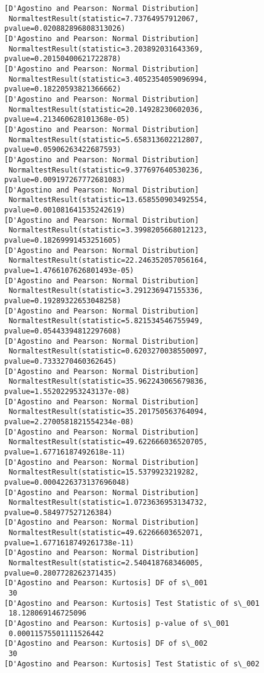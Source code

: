 \documentclass[11pt]{article}
\begin{document}
\begin{Verbatim}[commandchars=\\\{\}]
[D'Agostino and Pearson: Normal Distribution]
 NormaltestResult(statistic=7.73764957912067, pvalue=0.020882896808313026)
[D'Agostino and Pearson: Normal Distribution]
 NormaltestResult(statistic=3.203892031643369, pvalue=0.20150400621722878)
[D'Agostino and Pearson: Normal Distribution]
 NormaltestResult(statistic=3.4052354059096994, pvalue=0.18220593821366662)
[D'Agostino and Pearson: Normal Distribution]
 NormaltestResult(statistic=20.14928230602036, pvalue=4.213460628101368e-05)
[D'Agostino and Pearson: Normal Distribution]
 NormaltestResult(statistic=5.658313602212807, pvalue=0.05906263422687593)
[D'Agostino and Pearson: Normal Distribution]
 NormaltestResult(statistic=9.377697640530236, pvalue=0.009197267772681083)
[D'Agostino and Pearson: Normal Distribution]
 NormaltestResult(statistic=13.658550903492554, pvalue=0.001081641535242619)
[D'Agostino and Pearson: Normal Distribution]
 NormaltestResult(statistic=3.3998205668012123, pvalue=0.18269991453251605)
[D'Agostino and Pearson: Normal Distribution]
 NormaltestResult(statistic=22.246352057056164, pvalue=1.4766107626801493e-05)
[D'Agostino and Pearson: Normal Distribution]
 NormaltestResult(statistic=3.291236947155336, pvalue=0.19289322653048258)
[D'Agostino and Pearson: Normal Distribution]
 NormaltestResult(statistic=5.821534546755949, pvalue=0.05443394812297608)
[D'Agostino and Pearson: Normal Distribution]
 NormaltestResult(statistic=0.6203270038550097, pvalue=0.7333270460362645)
[D'Agostino and Pearson: Normal Distribution]
 NormaltestResult(statistic=35.962243065679836, pvalue=1.552022953243137e-08)
[D'Agostino and Pearson: Normal Distribution]
 NormaltestResult(statistic=35.201750563764094, pvalue=2.2700581821554234e-08)
[D'Agostino and Pearson: Normal Distribution]
 NormaltestResult(statistic=49.622666036520705, pvalue=1.67716187492618e-11)
[D'Agostino and Pearson: Normal Distribution]
 NormaltestResult(statistic=15.5379923219282, pvalue=0.0004226373137696048)
[D'Agostino and Pearson: Normal Distribution]
 NormaltestResult(statistic=1.0723636953134732, pvalue=0.584977527126384)
[D'Agostino and Pearson: Normal Distribution]
 NormaltestResult(statistic=49.62266603652071, pvalue=1.6771618749261738e-11)
[D'Agostino and Pearson: Normal Distribution]
 NormaltestResult(statistic=2.540418768346005, pvalue=0.2807728262371435)
[D'Agostino and Pearson: Kurtosis] DF of s\_001
 30
[D'Agostino and Pearson: Kurtosis] Test Statistic of s\_001
 18.128069146725096
[D'Agostino and Pearson: Kurtosis] p-value of s\_001
 0.00011575501111526442
[D'Agostino and Pearson: Kurtosis] DF of s\_002
 30
[D'Agostino and Pearson: Kurtosis] Test Statistic of s\_002

\end{Verbatim}
\end{document}
